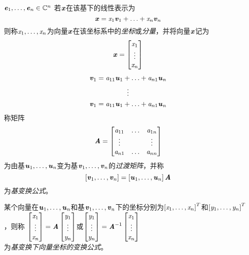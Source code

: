 \begin{definition}
    $\Ve_1, \ldots, \Ve_n \in \SetC^n$
    若$\Vx$在该基下的线性表示为
    $$\Vx = \Sx_1 \Vv_1 + \ldots + \Sx_n\Vv_n$$
    则称$\Sx_1, \ldots, \Sx_n$为向量$\Vx$在该坐标系中的\emph{坐标}或\emph{分量}，并将向量$\Vx$记为$$\Vx = \begin{bmatrix}
        \Sx_1  \\
            \vdots \\
            \Sx_n  \\
    \end{bmatrix}$$
    \begin{gather}
        \Vv_1 = \Sa_{11}\Vu_1 + \ldots + \Sa_{n1}\Vu_n \\
        \vdots \\
        \Vv_1 = \Sa_{11}\Vu_1 + \ldots + \Sa_{n1}\Vu_n
    \end{gather}
    称矩阵
    \[ \MA = \begin{bmatrix}
        \Sa_{11} & \ldots & \Sa_{1n} \\
        \vdots   &        & \vdots   \\
        \Sa_{n1} & \ldots & \Sa_{nn}
    \end{bmatrix} \]
    为由基$\Vu_1, \ldots, \Vu_n$变为基$\Vv_1, \ldots, \Vv_n$的\emph{过渡矩阵}，并称
    $$
    \left[\Vv_1, \ldots, \Vv_n\right] = \left[\Vu_1, \ldots, \Vu_n \right] \MA
    $$
    为\emph{基变换公式}。

    某个向量在$\Vu_1, \ldots, \Vu_n$和基$\Vv_1, \ldots, \Vv_n$下的坐标分别为$\left[\Sx_1, \ldots, \Sx_n \right]^T$和$\left[\Sy_1, \ldots, \Sy_n \right]^T$，则称
    $\begin{bmatrix}
        \Sx_1 \\
        \vdots \\
        \Sx_n
    \end{bmatrix} = \MA \begin{bmatrix}
        \Sy_1 \\
        \vdots \\
        \Sy_n
    \end{bmatrix}$或$\begin{bmatrix}
        \Sy_1 \\
        \vdots \\
        \Sy_n
    \end{bmatrix} = \MA^{-1} \begin{bmatrix}
        \Sx_1 \\
                                 \vdots \\
                                 \Sx_n
    \end{bmatrix}$ \\
                             为\emph{基变换下向量坐标的变换公式}。
\end{definition}

